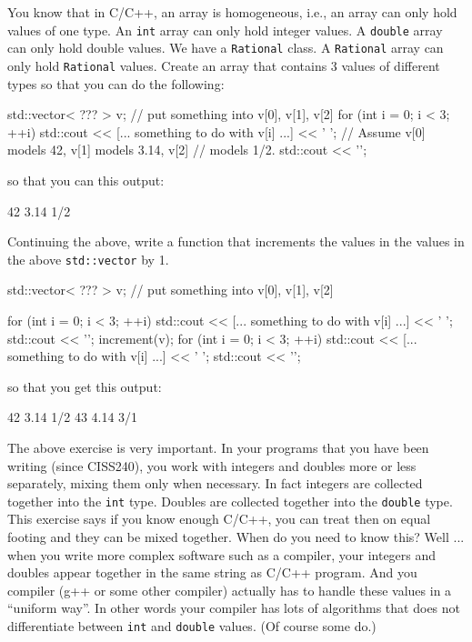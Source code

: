 \begin{ex} You know that in C/C++, an array is homogeneous, i.e., an array can only hold values of one type. An \verb!int! array can only hold integer values. A \verb!double! array can only hold double values. We have a \verb!Rational! class. A \verb!Rational! array can only hold \verb!Rational! values. Create an array that contains 3 values of different types so that you can do the following:

\begin{console}
std::vector< ??? > v;
// put something into v[0], v[1], v[2]
for (int i = 0; i < 3; ++i)
{   
    std::cout << [... something to do with v[i] ...] << '{} ';
}
// Assume v[0] models 42, v[1] models 3.14, v[2]
// models 1/2.
std::cout << '\n';
\end{console}

so that you can this output:

\begin{console}
42 3.14 1/2
\end{console}
\end{ex}



\begin{ex}Continuing the above, write a function that increments the values in the values in the above \verb!std::vector! by 1.


\begin{console}
std::vector< ??? > v;
// put something into v[0], v[1], v[2]

for (int i = 0; i < 3; ++i)
{   
    std::cout << [... something to do with v[i] ...] << ' ';
}
std::cout << '\n';
increment(v);
for (int i = 0; i < 3; ++i)
{   
    std::cout << [... something to do with v[i] ...] << ' ';
}
std::cout << '\n';
\end{console}

so that you get this output:

\begin{console}
42 3.14 1/2
43 4.14 3/1
\end{console}
\end{ex}
The above exercise is very important. In your programs that you have been writing (since CISS240), you work with integers and doubles more or less separately, mixing them only when necessary. In fact integers are collected together into the \verb!int! type. Doubles are collected together into the \verb!double! type. This exercise says if you know enough C/C++, you can treat then on equal footing and they can be mixed together. When do you need to know this? Well ... when you write more complex software such as a compiler, your integers and doubles appear together in the same string as C/C++ program. And you compiler (g++ or some other compiler) actually has to handle these values in a ``uniform way''. In other words your compiler has lots of algorithms that does not differentiate between \verb!int! and \verb!double! values. (Of course some do.)


